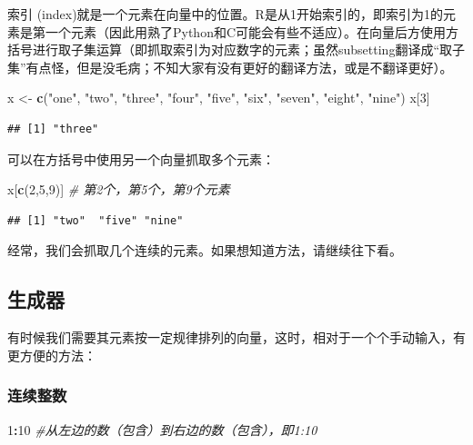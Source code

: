\documentclass[]{book}
\newenvironment{Shaded}{\begin{snugshade}}{\end{snugshade}}
\newcommand{\CommentTok}[1]{\textcolor[rgb]{0.56,0.35,0.01}{\textit{#1}}}
\newcommand{\DecValTok}[1]{\textcolor[rgb]{0.00,0.00,0.81}{#1}}
\newcommand{\KeywordTok}[1]{\textcolor[rgb]{0.13,0.29,0.53}{\textbf{#1}}}
\newcommand{\NormalTok}[1]{#1}
\newcommand{\OperatorTok}[1]{\textcolor[rgb]{0.81,0.36,0.00}{\textbf{#1}}}
\newcommand{\StringTok}[1]{\textcolor[rgb]{0.31,0.60,0.02}{#1}}
\begin{document}
索引 (index)就是一个元素在向量中的位置。R是从1开始索引的，即索引为1的元素是第一个元素（因此用熟了Python和C可能会有些不适应）。在向量后方使用方括号进行取子集运算（即抓取索引为对应数字的元素；虽然subsetting翻译成``取子集''有点怪，但是没毛病；不知大家有没有更好的翻译方法，或是不翻译更好）。

\begin{Shaded}
\begin{Highlighting}[]
\NormalTok{x <-}\StringTok{ }\KeywordTok{c}\NormalTok{(}\StringTok{"one"}\NormalTok{, }\StringTok{"two"}\NormalTok{, }\StringTok{"three"}\NormalTok{, }\StringTok{"four"}\NormalTok{, }\StringTok{"five"}\NormalTok{, }\StringTok{"six"}\NormalTok{, }\StringTok{"seven"}\NormalTok{, }\StringTok{"eight"}\NormalTok{, }\StringTok{"nine"}\NormalTok{)}
\NormalTok{x[}\DecValTok{3}\NormalTok{]}
\end{Highlighting}
\end{Shaded}

\begin{verbatim}
## [1] "three"
\end{verbatim}

可以在方括号中使用另一个向量抓取多个元素：

\begin{Shaded}
\begin{Highlighting}[]
\NormalTok{x[}\KeywordTok{c}\NormalTok{(}\DecValTok{2}\NormalTok{,}\DecValTok{5}\NormalTok{,}\DecValTok{9}\NormalTok{)] }\CommentTok{# 第2个，第5个，第9个元素}
\end{Highlighting}
\end{Shaded}

\begin{verbatim}
## [1] "two"  "five" "nine"
\end{verbatim}

经常，我们会抓取几个连续的元素。如果想知道方法，请继续往下看。

\hypertarget{generator}{%
\subsection{生成器}\label{generator}}

有时候我们需要其元素按一定规律排列的向量，这时，相对于一个个手动输入，有更方便的方法：

\subsubsection{连续整数}

\begin{Shaded}
\begin{Highlighting}[]
\DecValTok{1}\OperatorTok{:}\DecValTok{10} \CommentTok{#从左边的数（包含）到右边的数（包含），即1:10}
\end{Highlighting}
\end{Shaded}
\end{document}
